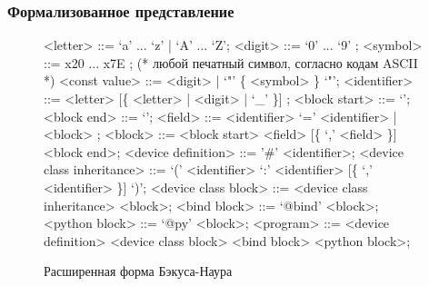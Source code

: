 \begin{frame}%
    \frametitle{Формализованное представление}
    \begin{figure}[!htbp]
        \begin{adjustbox}{max totalsize={\textwidth}{\textheight}}
            \begin{minipage}{\linewidth}
                \begin{grammar}
                    <letter> ::= `a' ... `z' | `A' ... `Z'; \newline
                    <digit> ::= `0' ... `9' ; \newline
                    <symbol> ::= x20 ... x7E ; (* любой печатный символ, согласно кодам ASCII *) \newline
                    <const value> ::= <digit> | `"' \{ <symbol> \} `"'; \newline
                    <identifier> ::= <letter> [\{ <letter> | <digit> | `\_' \}] ; \newline
                    <block start> ::= `{'; \newline
                    <block end> ::= `}'; \newline
                    <field> ::= <identifier> `=' <identifier> | <block> ; \newline
                    <block> ::= <block start> <field> [\{ `,' <field> \}] <block end>; \newline
                    <device definition> ::= '\#' <identifier>; \newline
                    <device class inheritance> ::= `(' <identifier> `:' <identifier> [\{ `,' <identifier> \}] `)'; \newline
                    <device class block> ::= <device class inheritance> <block>; \newline
                    <bind block> ::= `@bind' <block>; \newline
                    <python block> ::= `@py' <block>; \newline
                    <program> ::= <device definition> <device class block> <bind block> <python block>;
                \end{grammar}
            \end{minipage}
        \end{adjustbox}
        \caption{Расширенная форма Бэкуса-Наура \mylanguage}\label{fig:qpydev-grammar}
    \end{figure}
\end{frame}


